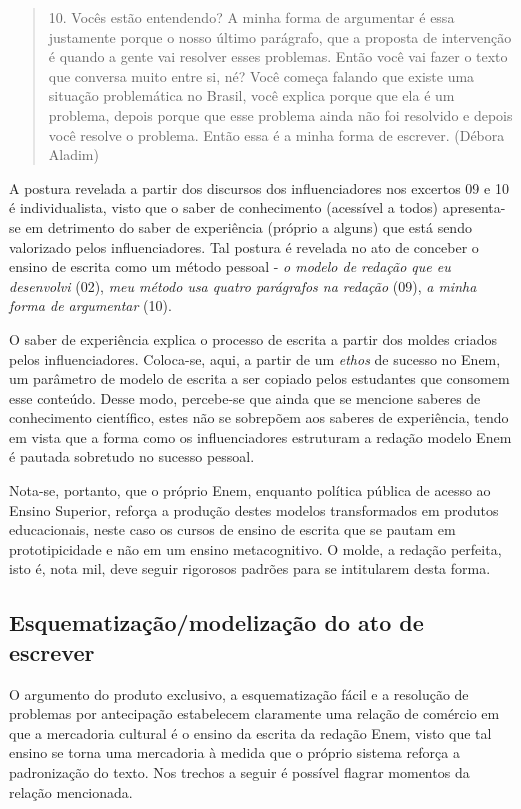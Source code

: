 \documentclass[portuguese]{textolivre}
\begin{document}
\begin{quote}
  10. Vocês estão entendendo? A minha forma de argumentar é essa justamente porque o nosso último parágrafo, que a proposta de intervenção é quando a gente vai resolver esses problemas. Então você vai fazer o texto que conversa muito entre si, né? Você começa falando que existe uma situação problemática no Brasil, você explica porque que ela é um problema, depois porque que esse problema ainda não foi resolvido e depois você resolve o problema. Então essa é a minha forma de escrever. (Débora Aladim)
\end{quote}

A postura revelada a partir dos discursos dos influenciadores nos excertos 09 e 10 é individualista, visto que o saber de conhecimento (acessível a todos) apresenta-se em detrimento do saber de experiência (próprio a alguns) que está sendo valorizado pelos influenciadores. Tal postura é revelada no ato de conceber o ensino de escrita como um método pessoal - \textit{o modelo de redação que eu desenvolvi} (02), \textit{meu método usa quatro parágrafos na redação} (09), \textit{a minha forma de argumentar} (10).

O saber de experiência explica o processo de escrita a partir dos moldes criados pelos influenciadores. Coloca-se, aqui, a partir de um \textit{ethos} de sucesso no Enem, um parâmetro de modelo de escrita a ser copiado pelos estudantes que consomem esse conteúdo. Desse modo, percebe-se que ainda que se mencione saberes de conhecimento científico, estes não se sobrepõem aos saberes de experiência, tendo em vista que a forma como os influenciadores estruturam a redação modelo Enem é pautada sobretudo no sucesso pessoal.

Nota-se, portanto, que o próprio Enem, enquanto política pública de acesso ao Ensino Superior, reforça a produção destes modelos transformados em produtos educacionais, neste caso os cursos de ensino de escrita que se pautam em prototipicidade e não em um ensino metacognitivo. O molde, a redação perfeita, isto é, nota mil, deve seguir rigorosos padrões para se intitularem desta forma. 

\subsection{Esquematização/modelização do ato de escrever}\label{sec-autores}
O argumento do produto exclusivo, a esquematização fácil e a resolução de problemas por antecipação estabelecem claramente uma relação de comércio em que a mercadoria cultural é o ensino da escrita da redação Enem, visto que tal ensino se torna uma mercadoria à medida que o próprio sistema reforça a padronização do texto. Nos trechos a seguir é possível flagrar momentos da relação mencionada. 
\end{document}
